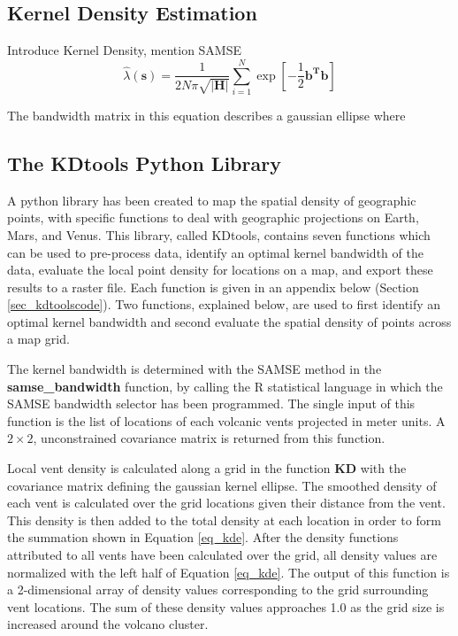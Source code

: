 \documentclass[12pt,letter]{article}
\begin{document}
\subsection{Kernel Density Estimation}

Introduce Kernel Density, mention SAMSE
\begin{equation}
\hat{\lambda}(\mathbf{s})=\frac{1}{2N\pi\sqrt{|\mathbf{H}|}}\sum\limits_{i=1}^{N}\exp\left[-\frac{1}{2}\mathbf{b^Tb}\right]
\label{eq_kde}
\end{equation}

The bandwidth matrix in this equation describes a gaussian ellipse where 


\subsection{The KDtools Python Library}

A python library has been created to map the spatial density of geographic points, with specific functions to deal with geographic projections on Earth, Mars, and Venus. This library, called KDtools, contains seven functions which can be used to pre-process data, identify an optimal kernel bandwidth of the data, evaluate the local point density for locations on a map, and export these results to a raster file. Each function is given in an appendix below (Section \ref{sec_kdtoolscode}). Two functions, explained below, are used to first identify an optimal kernel bandwidth and second evaluate the spatial density of points across a map grid.

The kernel bandwidth is determined with the SAMSE method in the \textbf{samse\_bandwidth} function, by calling the R statistical language in which the SAMSE bandwidth selector has been programmed. The single input of this function is the list of locations of each volcanic vents projected in meter units. A $2\times 2$, unconstrained covariance matrix is returned from this function.

Local vent density is calculated along a grid in the function \textbf{KD} with the covariance matrix defining the gaussian kernel ellipse. The smoothed density of each vent is calculated over the grid locations given their distance from the vent. This density is then added to the total density at each location in order to form the summation shown in Equation \ref{eq_kde}. After the density functions attributed to all vents have been calculated over the grid, all density values are normalized with the left half of Equation \ref{eq_kde}. The output of this function is a 2-dimensional array of density values corresponding to the grid surrounding vent locations. The sum of these density values approaches 1.0 as the grid size is increased around the volcano cluster.
\end{document}
